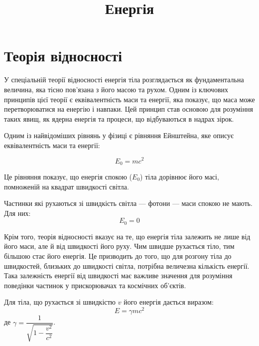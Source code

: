 \documentclass{article}
\title{Енергія}
\author{}
\date{}
\numberwithin{ExampleCounter}{section}
\numberwithin{equation}{ExampleCounter}
\begin{document}
\maketitle

\section{Теорія відносності}

У спеціальній теорії відносності енергія тіла розглядається як фундаментальна величина, яка тісно
пов'язана з його масою та рухом. Одним із ключових принципів цієї теорії є еквівалентність маси та
енергії, яка показує, що маса може перетворюватися на енергію і навпаки. Цей принцип став основою для
розуміння таких явищ, як ядерна енергія та процеси, що відбуваються в надрах зірок.

\begin{Example}\label{ex:einstein}
	Одним із найвідоміших рівнянь у фізиці є рівняння Ейнштейна, яке описує еквівалентність маси та
	енергії:

	\begin{equation}\label{eq:einstein}
		E_0 = mc^2
	\end{equation}

	Це рівняння показує, що енергія спокою ($E_0$) тіла дорівнює його масі, помноженій на квадрат
	швидкості світла.

    Частинки які рухаються зі швидкість світла --- фотони --- маси спокою не мають. Для них:
    \begin{equation}
        E_0 = 0
    \end{equation}

\end{Example}

Крім того, теорія відносності вказує на те, що енергія тіла залежить не лише від його маси, але й від
швидкості його руху. Чим швидше рухається тіло, тим більшою стає його енергія. Це призводить до того,
що для розгону тіла до швидкостей, близьких до швидкості світла, потрібна величезна кількість
енергії. Така залежність енергії від швидкості має важливе значення для розуміння поведінки частинок
у прискорювачах та космічних об'єктів.



\begin{Example}\label{ex:einstein2}
	Для тіла, що рухається зі швидкістю $v$ його енергія дається виразом:
	\begin{equation}\label{eq:einstein2}
		E = \gamma mc^2
	\end{equation}
де $\gamma = \dfrac1{\sqrt{1-\dfrac{v^2}{c^2}}}$.
\end{Example}
\end{document}
